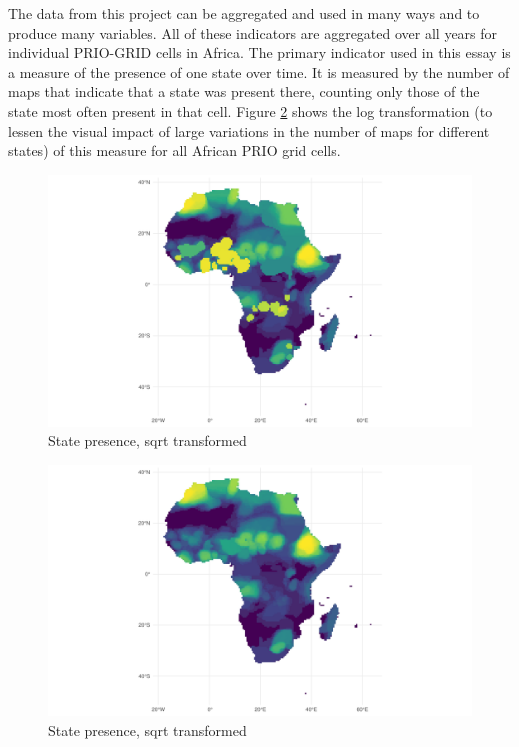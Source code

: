 \documentclass[12pt]{article}
\begin{document}
The data from this project can be aggregated and used in many ways and to
produce many variables. All of these indicators are aggregated over all years
for individual PRIO-GRID cells in Africa. The primary indicator used in this
essay is a measure of the presence of one state over time. It is measured by the
number of maps that indicate that a state was present there, counting only those
of the state most often present in that cell. Figure \ref{Sp} shows the log
transformation (to lessen the visual impact of large variations in the number of
maps for different states) of this measure for all African PRIO grid cells.

\begin{figure}[htpb]
	\centering
	\includegraphics[width=\linewidth]{../R/Output/sp_os_i_sum_any_plot.pdf}
	\caption{State presence, sqrt transformed}
	\label{Sp_i}
\end{figure}

\begin{figure}[htpb]
	\centering
	\includegraphics[width=\linewidth]{../R/Output/sp_os_sum_any_plot.pdf}
	\caption{State presence, sqrt transformed}
	\label{Sp}
\end{figure}
\end{document}
